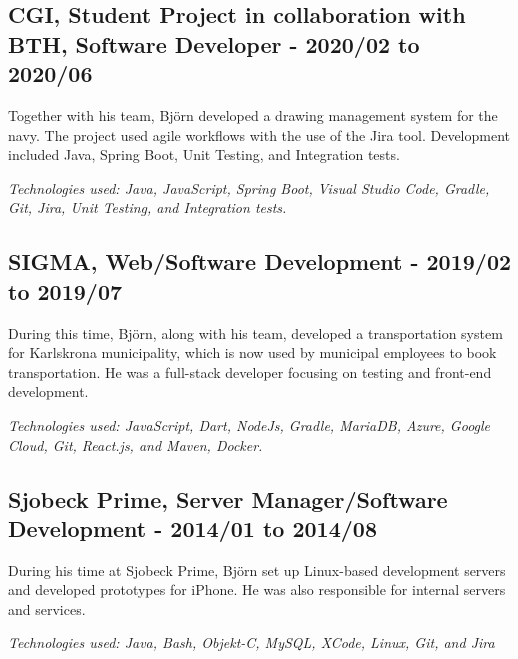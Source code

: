 \begin{minipage}[t]{0.9\textwidth}
\vspace{15pt} %
\subsection*{\textcolor{colorTitelErfarenhet}{CGI, Student Project in collaboration with BTH, Software Developer - 2020/02 to 2020/06}}
Together with his team, Björn developed a drawing management system for the navy. The project used agile workflows with the use of the Jira tool. Development included Java, Spring Boot, Unit Testing, and Integration tests.

\vspace{5pt}\textit{Technologies used: Java, JavaScript, Spring Boot, Visual Studio Code, Gradle, Git, Jira, Unit Testing, and Integration tests.} 

\vspace{15pt} %
\subsection*{\textcolor{colorTitelErfarenhet}{SIGMA, Web/Software Development - 2019/02 to 2019/07}}
During this time, Björn, along with his team, developed a transportation system for Karlskrona municipality, which is now used by municipal employees to book transportation. He was a full-stack developer focusing on testing and front-end development.

\vspace{5pt}\textit{Technologies used: JavaScript, Dart, NodeJs, Gradle, MariaDB, Azure, Google Cloud, Git, React.js, and Maven, Docker.} 

\vspace{15pt} %

\subsection*{\textcolor{colorTitelErfarenhet}{Sjobeck Prime, Server Manager/Software Development - 2014/01 to 2014/08}}
During his time at Sjobeck Prime, Björn set up Linux-based development servers and developed prototypes for iPhone. He was also responsible for internal servers and services.

\vspace{5pt}\textit{Technologies used: Java, Bash, Objekt-C, MySQL, XCode, Linux, Git, and Jira} 

\vspace{15pt} %

\end{minipage}
